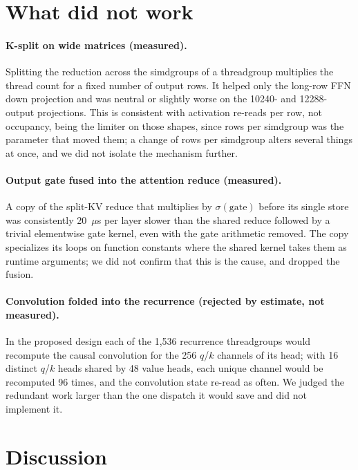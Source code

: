 \documentclass[11pt]{article}
\begin{document}
\section{What did not work}
\label{sec:negative}
\paragraph{K-split on wide matrices (measured).} Splitting the reduction
across the simdgroups of a threadgroup multiplies the thread count for a
fixed number of output rows. It helped only the long-row FFN down projection
and was neutral or slightly worse on the 10240- and 12288-output projections.
This is consistent with activation re-reads per row, not occupancy, being the
limiter on those shapes, since rows per simdgroup was the parameter that
moved them; a change of rows per simdgroup alters several things at once,
and we did not isolate the mechanism further.
\paragraph{Output gate fused into the attention reduce (measured).} A copy of
the split-KV reduce that multiplies by $\sigma(\text{gate})$ before its single
store was consistently 20~$\mu$s per layer slower than the shared reduce
followed by a trivial elementwise gate kernel, even with the gate arithmetic
removed. The copy specializes its loops on function constants where the shared
kernel takes them as runtime arguments; we did not confirm that this is the
cause, and dropped the fusion.
\paragraph{Convolution folded into the recurrence (rejected by estimate, not
measured).} In the proposed design each of the 1,536 recurrence
threadgroups would recompute the causal convolution for the 256 $q$/$k$
channels of its head; with 16 distinct $q$/$k$ heads shared by 48 value
heads, each unique channel would be recomputed 96 times, and the convolution
state re-read as often. We judged the redundant work larger than the one
dispatch it would save and did not implement it.

\section{Discussion}
\label{sec:discussion}
\end{document}
